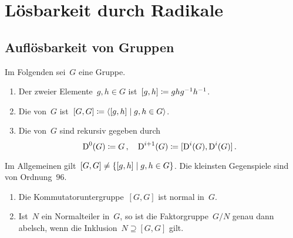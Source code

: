 \section{Lösbarkeit durch Radikale}



\subsection{Auflösbarkeit von Gruppen}

\begin{convention}
  Im Folgenden sei~$G$ eine Gruppe.
\end{convention}

\begin{definition}
  \leavevmode
  \begin{enumerate}
    \item
      Der  zweier Elemente~$g, h \in G$ ist~$[g,h] \coloneqq g h g^{-1} h^{-1}$.
    \item
      Die  von~$G$ ist~$[G,G] \defined \gen{ [g,h] \suchthat g, h \in G }$.
    \item
      Die  von~$G$ sind rekursiv gegeben durch
      \[
        \operatorname{D}^0(G) \coloneqq G \,,
        \quad
        \operatorname{D}^{i+1}(G) \coloneqq [\operatorname{D}^i(G), \operatorname{D}^i(G)] \,.
      \]
  \end{enumerate}
\end{definition}

\begin{warning}
  Im Allgemeinen gilt~$[G,G] \neq \{ [g,h] \suchthat g, h \in G \}$.
  Die kleinsten Gegenspiele sind von Ordnung~$96$.
\end{warning}

\begin{proposition}
  \leavevmode
  \begin{enumerate}
    \item
      Die Kommutatoruntergruppe~$[G,G]$ ist normal in~$G$.
    \item
      Ist~$N$ ein Normalteiler in~$G$, so ist die Faktorgruppe~$G/N$ genau dann abelsch, wenn die Inklusion~$N \supseteq [G,G]$ gilt.
  \end{enumerate}
\end{proposition}


